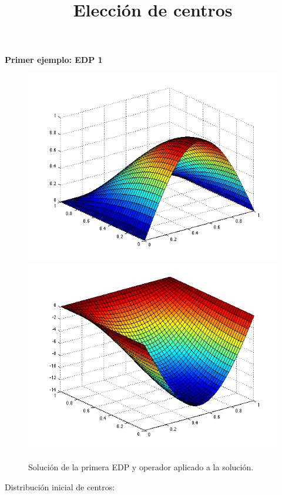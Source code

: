 \documentclass[11pt,a4paper]{article}
\date{}
\title{Elección de centros}
\begin{document}
\textbf{Primer ejemplo: EDP 1}
\begin{figure}[H]
\includegraphics[scale=.5]{edp1.png}
\includegraphics[scale=.4]{Ledp1.png}
\caption{Solución de la primera EDP y operador aplicado a la solución.}
\end{figure}
Distribución inicial de centros: 
\end{document}
